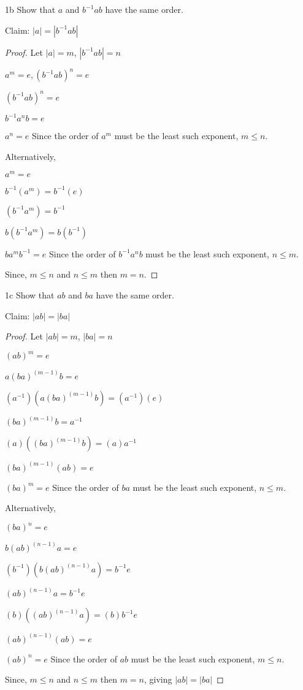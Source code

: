 \begin{question}{1b} Show that $a$ and $b^{-1}ab$ have the same order.

Claim: $|a| = |b^{-1}ab|$
\begin{proof}
Let $|a|=m$, $|b^{-1}ab|=n$

$a^m = e, (b^{-1}ab)^n = e$

$(b^{-1}ab)^n = e$

$b^{-1}a^nb = e$

$a^n = e$ Since the order of $a^m$ must be the least such exponent, $m \leq n$.


Alternatively, 

$a^m = e$

$b^{-1}(a^m) = b^{-1}(e)$

$(b^{-1}a^m) = b^{-1}$

$b(b^{-1}a^m) = b(b^{-1})$

$ba^mb^{-1} = e$ Since the order of $b^{-1}a^nb$ must be the least such exponent, $n \leq m$.

Since, $m \leq n$ and $n \leq m$ then $m = n$.
\end{proof}
\end{question}

\begin{question}{1c} Show that $ab$ and $ba$ have the same order.

Claim: $|ab| = |ba|$
\begin{proof}
Let $|ab|=m$, $|ba|=n$

$(ab)^m = e$

$a(ba)^{(m-1)}b = e$

$(a^{-1})(a(ba)^{(m-1)}b) = (a^{-1})(e)$

$(ba)^{(m-1)}b = a^{-1}$

$(a)((ba)^{(m-1)}b) = (a)a^{-1}$

$(ba)^{(m-1)}(ab) = e$

$(ba)^{m} = e$ Since the order of $ba$ must be the least such exponent, $n \leq m$.

Alternatively,

$(ba)^n = e$

$b(ab)^{(n-1)}a = e$

$(b^{-1})(b(ab)^{(n-1)}a) = b^{-1}e$

$(ab)^{(n-1)}a = b^{-1}e$

$(b) ((ab)^{(n-1)}a) = (b)b^{-1}e$

$(ab)^{(n-1)}(ab) = e$

$(ab)^{n} = e$ Since the order of $ab$ must be the least such exponent, $m \leq n$.

Since, $m \leq n$ and $n \leq m$ then $m = n$, giving $|ab| = |ba|$
\end{proof}
\end{question}

